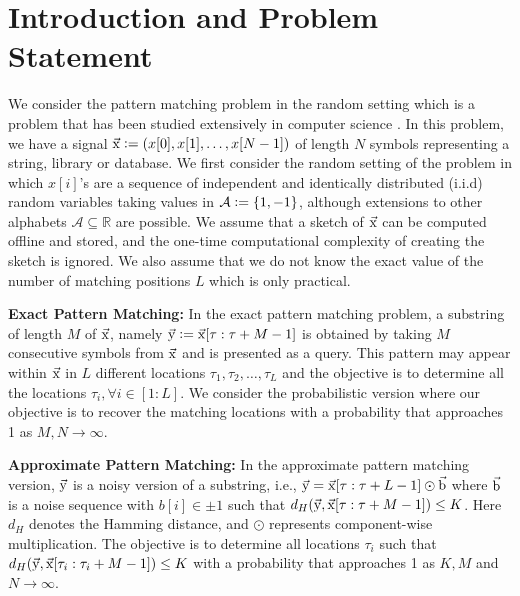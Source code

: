 \section{Introduction and Problem Statement}
\label{sec:introduction}
We consider the pattern matching problem in the random setting which is a problem that has been studied extensively in computer science \cite{}. In this problem, we have a signal $\vec{\mathrm{x}} \mathrel{\mathop:}= (x[0], x[1],\ldots, x[N-1])$ of length $N$ symbols representing a string, library or database. We first consider the random setting of the problem in which $x[i]$'s are a sequence of independent and identically distributed (i.i.d) random variables taking values in $\mathcal{A} \mathrel{\mathop:}= \{1,-1\}$, although extensions to other alphabets $\mathcal{A} \subseteq \mathbb{R}$ are possible. We assume that a sketch of $\vec{\mathrm{x}}$ can be computed offline and stored, and the one-time computational complexity of creating the sketch is ignored. We also assume that we do not know the exact value of the number of matching positions $L$ which is only practical. 

{\bf Exact Pattern Matching:} In the exact pattern matching problem, a substring of length $M$ of $\vec{\mathrm{x}}$, namely $\vec{\mathrm{y}} \mathrel{\mathop:}= \vec{\mathrm{x}}[\tau:\tau+M-1]$ is obtained by taking $M$ consecutive symbols from $\vec{\mathrm{x}}$ and is presented as a query. This pattern may appear within $\vec{\mathrm{x}}$ in $L$ different locations $\tau_1,\tau_2,\ldots,\tau_L$ and the objective is to determine all the locations $\tau_i, \forall i\in[1:L]$. We consider the probabilistic version where our objective is to recover the matching locations with a probability that approaches 1 as $M,N \rightarrow \infty$.

{\bf Approximate Pattern Matching:} In the approximate pattern matching version, $\vec{\mathrm{y}}$ is a noisy version of a substring, i.e., $\vec{\mathrm{y}} = \vec{\mathrm{x}}[\tau:\tau+L-1] \odot \vec{\mathrm{b}}$ where $\vec{\mathrm{b}}$ is a noise sequence with $b[i] \in \pm 1$ such that $d_H(\vec{\mathrm{y}},\vec{\mathrm{x}}[\tau:\tau+M-1]) \leq K$. Here $d_H$ denotes the Hamming distance, and $\odot$ represents component-wise multiplication. The objective is to determine all locations $\tau_i$ such that $d_H(\vec{\mathrm{y}},\vec{\mathrm{x}}[\tau_i:\tau_i+M-1]) \leq K$ with a probability that approaches 1 as $K, M$ and $N \rightarrow \infty$.

